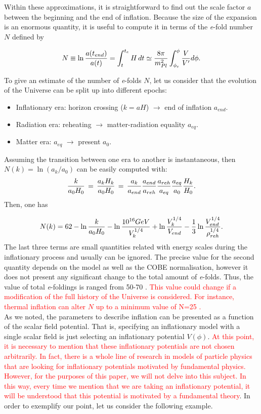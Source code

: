 \documentclass{rmaa}
\begin{document}
Within these approximations, it is straightforward to find out the scale factor $a$ between
the beginning and the end of inflation. Because the size of the expansion is 
an enormous quantity, it is useful to compute it in terms of the 
 {\it e}-fold number $N$ defined by 
 
\begin{equation} \label{eq:N}
N \equiv \ln {a(t_{end}) \over a(t)}=
\int_{t}^{t_e}{H\,dt} \simeq 
{8\pi \over m^2_{Pl}} \int_{\phi_e}^{\phi} {V \over V'} d\phi .
\end{equation}

\noindent
To give an estimate of the number of \textit{e}-folds $N$, let us consider that the evolution of the Universe 
can be split up into different epochs:

\begin{itemize}
\item Inflationary era: horizon crossing ($k=aH$) $\to$ end of inflation $a_{end}$.
\item Radiation era: reheating $\to$ matter-radiation equality $a_{eq}$.
\item Matter era: $a_{eq}$ $\to$ present $a_{0}$.
\end{itemize}

\noindent
Assuming the transition between one era to another is instantaneous, then $N(k)= \ln ({a_k / a_0})$
can be easily computed with:
$$ 
{k\over a_0 H_0}\,=\,{a_k H_k \over a_0 H_0}\,=\,{a_k\over a_{end}}{a_{end}\over a_{reh}}
{a_{reh}\over a_{eq}}{a_{eq} \over a_0}{H_k\over H_0}.
$$
Then, one has \citep{LiddleLyth}

$$
N(k)=62-\ln{k \over a_0 H_0}-\ln{10^{16} GeV \over V_k^{1/4}}+\ln{V_k^{1/4} \over V_{end}}-
{1 \over 3}\ln{V_{end}^{1/4} \over \rho_{reh}^{1/4}}.
$$
%
The last three terms are small quantities related with energy scales during the inflationary 
process and usually can be ignored.
The precise value for the second quantity depends on the model as well as the 
COBE normalisation, however it does not present any significant change to the total 
amount of \textit{e}-folds. 
Thus, the value of total \textit{e}-foldings is ranged from 50-70 \citep{Lyth}. 
\textcolor{red}{This value could change if a modification of the full history of the Universe is considered. 
For instance, thermal inflation can alter $N$ up to a minimum value of N=25 \citep{Lyth1,Lyth2}.}
\\

As we noted, the parameters to describe inflation can be presented
as a function of the scalar field potential. That is, specifying an inflationary 
model with a single scalar field is just selecting an inflationary potential $V(\phi)$. 
\textcolor{red}{At this point, it is necessary to mention that these inflationary potentials are not chosen arbitrarily. 
In fact, there is a whole line of research in models of particle physics that are looking for inflationary potentials 
motivated by fundamental physics. However, for the purposes of this paper, we will not delve into this subject. 
In this way, every time we mention that we are taking an inflationary potential, it will be 
understood that this potential is motivated by a fundamental theory}. 
In order to exemplify our point, let us consider the following example.
\end{document}
